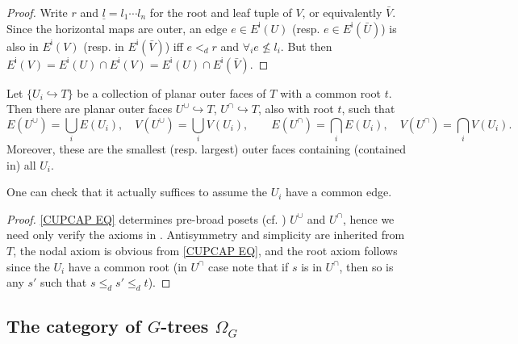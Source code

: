 \documentclass[a4paper,10pt,draft]{article}%
\begin{document}
\begin{proof}
	Write $r$ and $\underline{l}=l_1\cdots l_n$
	for the root and leaf tuple of $V$, or equivalently $\bar{V}$.
	Since the horizontal maps are outer, an edge
	$e \in E^{\mathsf{i}}(U)$ (resp. $e \in E^{\mathsf{i}}(\bar{U})$)
	is also in $E^{\mathsf{i}}(V)$ (resp. in $E^{\mathsf{i}}(\bar{V})$) iff
	$e <_d r$ and $\forall_i e \not \leq l_i$.
	But then $E^{\mathsf{i}}(V) = E^{\mathsf{i}}(U) \cap E^{\mathsf{i}}(V) = E^{\mathsf{i}}(U) \cap E^{\mathsf{i}}(\bar{V})$. 
\end{proof}


\begin{lemma}\label{CUPCAP LEM}
	Let $\{U_i \hookrightarrow T\}$ be a collection of planar outer faces of $T$ with a common root $t$. Then there are planar outer faces
	$U^{\cup} \hookrightarrow T$, $U^{\cap} \hookrightarrow T$,
	also with root $t$, such that
\begin{equation}\label{CUPCAP EQ}
	E(U^{\cup}) = \bigcup_i E(U_i), \quad
	V(U^{\cup}) = \bigcup_i V(U_i), \qquad
	E(U^{\cap}) = \bigcap_i E(U_i), \quad
	V(U^{\cap}) = \bigcap_i V(U_i).
\end{equation}
Moreover, these are the smallest (resp. largest) outer faces
containing (contained in) all $U_i$.
\end{lemma}

\begin{remark}
	One can check that it actually suffices to assume the $U_i$ have a common edge.
\end{remark}

\begin{proof}
	\eqref{CUPCAP EQ} determines pre-broad posets 
	(cf. \cite[Rem. 5.2]{Per17}) $U^{\cup}$ and $U^{\cap}$,
	hence we need only verify the axioms in 
	\cite[Defs. 5.1, 5.3, 5.9]{Per17}. 
	Antisymmetry and simplicity are inherited from $T$, the nodal axiom is obvious from \eqref{CUPCAP EQ}, and the root axiom follows since the $U_i$ have a common root (in $U^{\cap}$ case note that if $s$ is in $U^{\cap}$, then so is any $s'$ such that
	$s \leq_d s' \leq_d t$).
\end{proof}



\subsection{The category of $G$-trees $\Omega_G$}
\end{document}
